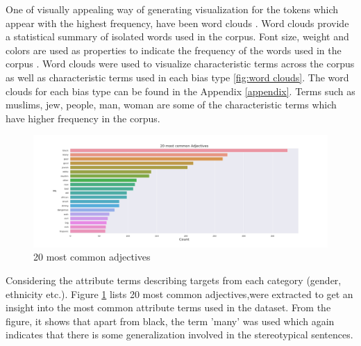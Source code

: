 One of visually appealing way of generating visualization for the tokens which appear with the highest frequency, have been word clouds \cite{heimerl2014word}. Word clouds provide a statistical summary of isolated words used in the corpus. Font size, weight and colors are used as properties to indicate the frequency of the words used in the corpus \cite{heimerl2014word}. Word clouds were used to visualize characteristic terms across the corpus as well as characteristic terms used in each bias type \ref{fig:word clouds}. The word clouds for each bias type can be found in the Appendix \ref{appendix}. Terms such as muslims, jew, people, man, woman are some of the characteristic terms which have higher frequency in the corpus.  

\begin{figure}[]
    \centering
    \includegraphics[width=1\columnwidth]{thesis/figures/20 most common Adjectives.png}
    \caption{20 most common adjectives}
    \label{fig:Common_adj}
\end{figure}

Considering the attribute terms describing targets from each category (gender, ethnicity etc.).  Figure \ref{fig:Common_adj} lists 20 most common adjectives,were extracted to get an insight into the most common attribute terms used in the dataset. From the figure, it shows that apart from black, the term 'many' was used which again indicates that there is some generalization involved in the stereotypical sentences.  

